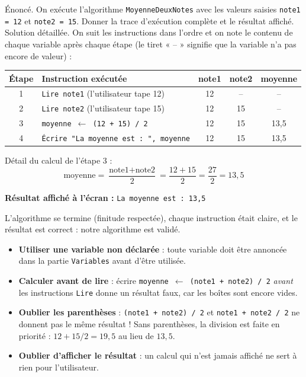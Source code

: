 \documentclass[11pt]{article}
\begin{document}
\begin{exoresolu}
Énoncé. On exécute l'algorithme \texttt{MoyenneDeuxNotes} avec les valeurs saisies \texttt{note1 = 12} et \texttt{note2 = 15}. Donner la trace d'exécution complète et le résultat affiché.
\tcblower
Solution détaillée. On suit les instructions dans l'ordre et on note le contenu de chaque variable après chaque étape (le tiret « -- » signifie que la variable n'a pas encore de valeur) :

\begin{center}
\begin{tabularx}{\linewidth}{|c|X|c|c|c|}
\hline
\rowcolor{popblueL}
\textbf{Étape} & \textbf{Instruction exécutée} & \textbf{note1} & \textbf{note2} & \textbf{moyenne} \\
\hline
1 & \texttt{Lire note1} (l'utilisateur tape 12) & 12 & -- & -- \\
\hline
2 & \texttt{Lire note2} (l'utilisateur tape 15) & 12 & 15 & -- \\
\hline
3 & \texttt{moyenne $\leftarrow$ (12 + 15) / 2} & 12 & 15 & 13,5 \\
\hline
4 & \texttt{Écrire "La moyenne est : ", moyenne} & 12 & 15 & 13,5 \\
\hline
\end{tabularx}
\end{center}

Détail du calcul de l'étape 3 :
\[ \text{moyenne} = \frac{\text{note1} + \text{note2}}{2} = \frac{12 + 15}{2} = \frac{27}{2} = 13{,}5 \]

\textbf{Résultat affiché à l'écran :} \texttt{La moyenne est : 13,5}

L'algorithme se termine (finitude respectée), chaque instruction était claire, et le résultat est correct : notre algorithme est validé.
\end{exoresolu}

\begin{attention}
\begin{itemize}
  \item \textbf{Utiliser une variable non déclarée} : toute variable doit être annoncée dans la partie \texttt{Variables} avant d'être utilisée.
  \item \textbf{Calculer avant de lire} : écrire \texttt{moyenne $\leftarrow$ (note1 + note2) / 2} \emph{avant} les instructions \texttt{Lire} donne un résultat faux, car les boîtes sont encore vides.
  \item \textbf{Oublier les parenthèses} : \texttt{(note1 + note2) / 2} et \texttt{note1 + note2 / 2} ne donnent pas le même résultat ! Sans parenthèses, la division est faite en priorité : $12 + 15/2 = 19{,}5$ au lieu de $13{,}5$.
  \item \textbf{Oublier d'afficher le résultat} : un calcul qui n'est jamais affiché ne sert à rien pour l'utilisateur.
\end{itemize}
\end{attention}
\end{document}
